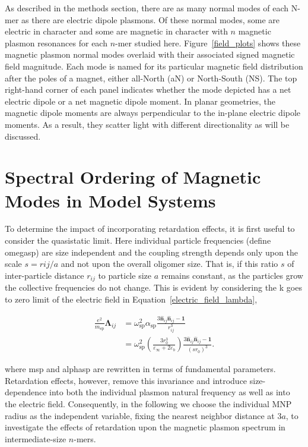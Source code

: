 \documentclass[journal=apchd5,manuscript=article]{achemso}
\begin{document}
As described in the methods section, there are as many normal modes of each N-mer as there are electric dipole plasmons. Of these normal modes, some are electric in character and some are magnetic in character with $n$ magnetic plasmon resonances for each $n$-mer studied here. Figure~\ref{field_plots} shows these magnetic plasmon normal modes overlaid with their associated signed magnetic field magnitude. Each mode is named for its particular magnetic field distribution after the poles of a magnet, either all-North (aN) or North-South (NS). The top right-hand corner of each panel indicates whether the  mode depicted has a net electric dipole or a net magnetic dipole moment. In planar geometries, the magnetic dipole moments are always perpendicular to the in-plane electric dipole moments. As a result, they scatter light with different directionality as will be discussed.

\section{Spectral Ordering of Magnetic Modes in Model Systems}

To determine the impact of incorporating retardation effects, it is first useful to consider the quasistatic limit. Here individual particle frequencies (define omegasp) are size independent and the coupling strength depends only upon the scale $s = rij/a$ and not upon the overall oligomer size. That is, if this ratio $s$ of inter-particle distance $r_{ij}$ to particle size $a$ remains constant, as the particles grow the collective frequencies do not change. This is evident by considering the k goes to zero limit of the electric field in Equation~\ref{electric_field_lambda},

\begin{equation}
\begin{aligned}
\frac{e^2}{m_{\textrm{sp}}}\boldsymbol{\Lambda}_{ij} &= \omega_{\textrm{sp}}^2 \alpha_{\textrm{sp}}\frac{3\hat{\textbf{n}}_{ij}\hat{\textbf{n}}_{ij} - \textbf{1}}{r_{ij}^3} \\
&= \omega_{\textrm{sp}}^2 \left(\frac{3r_0^3}{\varepsilon_{\infty}+2\varepsilon_b}\right)\frac{3\hat{\textbf{n}}_{ij}\hat{\textbf{n}}_{ij} - \textbf{1}}{(sr_0)^3}.
\end{aligned}
\label{quasistatic_coupling}
\end{equation}

\noindent where msp and alphasp are rewritten in terms of fundamental parameters. Retardation effects, however, remove this invariance and introduce size-dependence into both the individual plasmon natural frequency as well as into the electric field. Consequently, in the following we choose the individual MNP radius as the independent variable, fixing the nearest neighbor distance at 3$a$, to investigate the effects of retardation upon the magnetic plasmon spectrum in intermediate-size $n$-mers.
\end{document}

